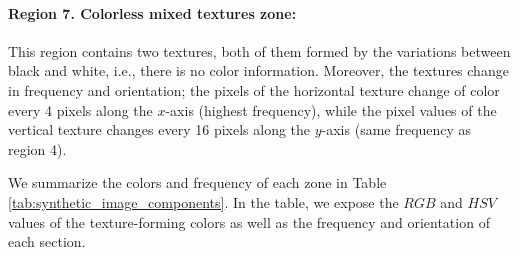 \paragraph{Region 7. Colorless mixed textures zone:}
This region contains two textures, both of them formed by the variations between black and white, i.e., there is no color information. Moreover, the textures change in frequency and orientation; the pixels of the horizontal texture change of color every 4 pixels along the $x$-axis (highest frequency), while the pixel values of the vertical texture changes every 16 pixels along the $y$-axis (same frequency as region 4).

We summarize the colors and frequency of each zone in Table \ref{tab:synthetic_image_components}. In the table, we expose the $RGB$ and $HSV$ values of the texture-forming colors as well as the frequency and orientation of each section.


